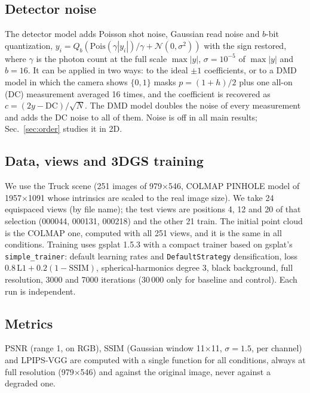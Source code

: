 \documentclass[conference]{IEEEtran}
\begin{document}
\subsection{Detector noise}
The detector model adds Poisson shot noise, Gaussian read noise and $b$-bit quantization,
$y_i=Q_b\!\left(\mathrm{Pois}(\gamma|y_i|)/\gamma+\mathcal N(0,\sigma^2)\right)$ with the sign restored, where $\gamma$ is the
photon count at the full scale $\max|y|$, $\sigma=10^{-5}$ of $\max|y|$ and $b=16$. It can be applied in two ways: to the ideal $\pm1$
coefficients, or to a DMD model in which the camera shows $\{0,1\}$ masks $p=(1+h)/2$ plus one all-on (DC) measurement averaged 16
times, and the coefficient is recovered as $c=(2y-\mathrm{DC})/\sqrt{N}$. The DMD model doubles the noise of every measurement and
adds the DC noise to all of them. Noise is off in all main results; Sec.~\ref{sec:order} studies it in 2D.

\subsection{Data, views and 3DGS training}
We use the Truck scene (251 images of 979$\times$546, COLMAP PINHOLE model of 1957$\times$1091 whose intrinsics are scaled to
the real image size). We take 24 equispaced views (by file name); the test views are positions 4, 12 and 20 of that
selection (000044, 000131, 000218) and the other 21 train. The initial point cloud is the COLMAP one, computed with all 251
views, and it is the same in all conditions. Training uses gsplat 1.5.3 with a compact trainer based on gsplat's
\texttt{simple\_trainer}: default learning rates and \texttt{DefaultStrategy} densification, loss
$0.8\,\mathrm{L1}+0.2(1-\mathrm{SSIM})$, spherical-harmonics degree 3, black background, full resolution, 3000 and 7000
iterations (30\,000 only for baseline and control). Each run is independent.

\subsection{Metrics}
PSNR (range 1, on RGB), SSIM (Gaussian window 11$\times$11, $\sigma=1.5$, per channel) \cite{wang2004ssim} and LPIPS-VGG
\cite{zhang2018lpips} are computed with a single function for all conditions, always at full resolution (979$\times$546)
and against the original image, never against a degraded one.
\end{document}
